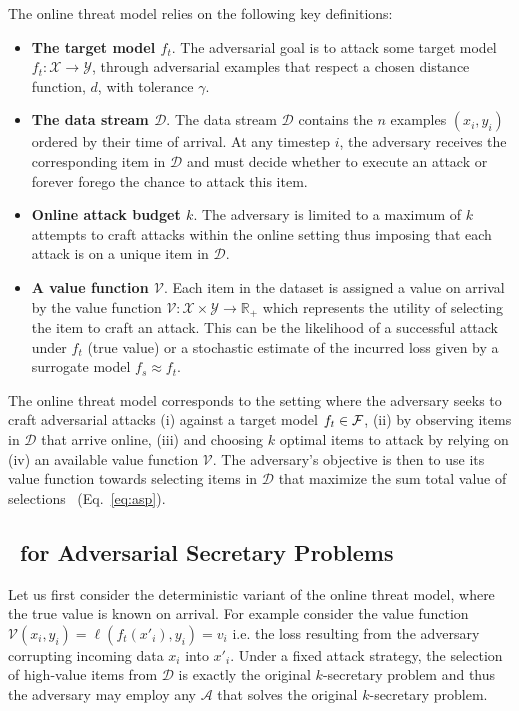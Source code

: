\begin{ftheo}
The online threat model relies on the following key definitions:
\begin{itemize}[leftmargin=*, itemsep=1pt, topsep=1pt, parsep=1pt]
\item 
\textbf{The target model $f_t$}. The adversarial goal is to attack some target model $f_t : \mathcal{X} \rightarrow \mathcal{Y}$, through adversarial examples that respect a chosen distance function, $d$, with tolerance $\gamma$. %

\item
\textbf{The data stream $\mathcal{D}$}. The data stream $\mathcal{D}$ contains the $n$ examples $(x_i,y_i)$ ordered by their time of arrival. At any timestep $i$, the adversary receives the corresponding item in $\mathcal{D}$ and must decide whether to execute an attack or forever forego the chance to attack this item.

\item
\textbf{Online attack budget $k$}. The adversary is limited to a maximum of $k$ attempts to craft attacks within the online setting thus imposing that each attack is on a unique item in $\mathcal{D}$.

\item
\textbf{A value function $\mathcal{V}$}. Each item in the dataset is assigned a value on arrival by the value function $\mathcal{V}: \mathcal{X} \times \mathcal{Y} \rightarrow \mathbb{R}_+$ which represents the utility of selecting the item to craft an attack. This can be the likelihood of a successful attack under $f_t$ (true value) or a stochastic estimate of the incurred loss given by a surrogate model $f_s \approx f_t$.
\end{itemize}

The online threat model corresponds to the setting where the adversary seeks to craft adversarial attacks (i) against a target model $f_t \in {\mathcal{F}}$, (ii) by observing items in $\mathcal{D}$ that arrive online, (iii) and choosing $k$ optimal items to attack by relying on (iv) an available value function $\mathcal{V}$. The adversary's objective is then to use its value function towards selecting items in $\mathcal{D}$ that maximize the sum total value of selections \setvalue\ (Eq.~\ref{eq:asp}).
\end{ftheo}

\subsection{\algoname\ for Adversarial Secretary Problems}
\label{virtual_plus}
Let us first consider the deterministic variant of the online threat model, where the true value is known on arrival. For example consider the value function $\mathcal{V}(x_i,y_i) = \ell(f_{t}(x'_i),y_i) = v_i$ i.e. the loss resulting from the adversary corrupting incoming data $x_i$ into $x'_i$. Under a fixed attack strategy, the selection of high-value items from $\mathcal{D}$ is exactly the original $k$-secretary problem and thus the adversary may employ any $\mathcal{A}$ that solves the original $k$-secretary problem.

